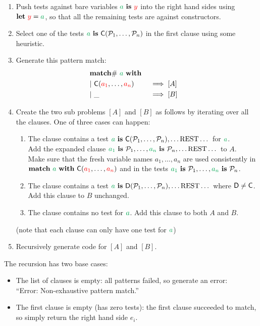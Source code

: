 \documentclass[a4paper, 11pt]{article}
\theoremstyle{definition}
\begin{document}
\begin{enumerate}
  \item Push tests against bare variables $\ba \is \fvar y$ into the right hand sides using $\mathbf{let}\ \fvar y = \ba$, so that all the remaining tests are against constructors.
  \item Select one of the tests $\ba \is \C(\pat_1, \dots, \pat_n)$ in the first clause using some heuristic.
  \item Generate this pattern match:
  \begin{alignat*}{4}
    \matchwithZ{\ba} \\
    \clause{\C(\fvar{a_1}, \dots, \fvar{a_n})}{[A]} \\
    \clause{\_}{[B]}
  \end{alignat*}
  \item Create the two sub problems $[A]$ and $[B]$ as follows by iterating over all the clauses. One of three cases can happen:
  \begin{enumerate}
    \item The clause contains a test $\ba \is \C(\pat_1, \dots, \pat_n), \dots \text{REST} \dots$ for $\ba$. \\
          Add the expanded clause $\bvar{a_1} \is \pat_1, \dots, \bvar{a_n} \is \pat_n, \dots \text{REST} \dots$ to $A$. \\
          Make sure that the fresh variable names $a_1,\dots,a_n$ are used consistently in \\
          $\mathbf{match}\ \ba\ \mathbf{with}\ \C(\fvar{a_1}, \dots, \fvar{a_n})$ and in the tests $\bvar{a_1} \is \pat_1, \dots, \bvar{a_n} \is \pat_n$.
    \item The clause contains a test $\ba \is \mathsf{D}(\pat_1, \dots, \pat_n), \dots \text{REST} \dots$ where $\mathsf{D} \neq \mathsf{\textcolor{black}{C}}$. \\
          Add this clause to $B$ unchanged.
    \item The clause contains no test for $\ba$. Add this clause to both $A$ and $B$.
  \end{enumerate}
  (note that each clause can only have one test for $\ba$)
  \item Recursively generate code for $[A]$ and $[B]$.
\end{enumerate}

\medskip

\noindent The recursion has two base cases:
\begin{itemize}
  \item The list of clauses is empty: all patterns failed, so generate an error:\\ ``Error: Non-exhaustive pattern match.''
  \item The first clause is empty (has zero tests): the first clause succeeded to match, so simply return the right hand side $e_i$.
\end{itemize}
\end{document}
